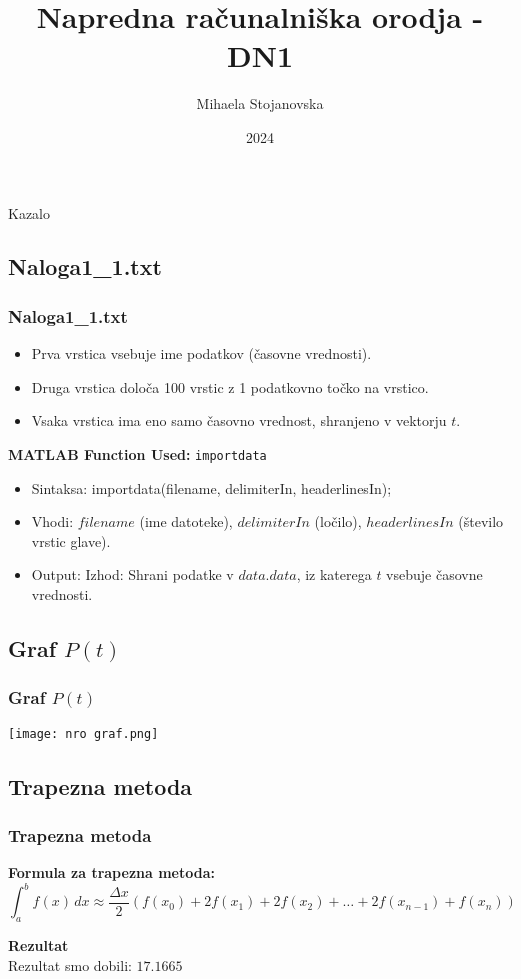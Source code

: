 \documentclass{beamer}
\title{Napredna računalniška orodja - DN1}
\author{Mihaela Stojanovska}
\date{2024}
\begin{document}
\begin{frame}
    \titlepage
\end{frame}

\begin{frame}{Kazalo}
    \tableofcontents
\end{frame}


\begin{frame}
\section{Naloga1\_1.txt}
\frametitle{Naloga1\_1.txt}
    \begin{itemize}
        \item Prva vrstica vsebuje ime podatkov (časovne vrednosti).
        \item Druga vrstica določa 100 vrstic z 1 podatkovno točko na vrstico.
        \item Vsaka vrstica ima eno samo časovno vrednost, shranjeno v vektorju $t$.
    \end{itemize}
    \vspace{0.5cm}
    \textbf{MATLAB Function Used:} \texttt{importdata} \\
    \begin{itemize}
        \item Sintaksa: importdata(filename, delimiterIn, headerlinesIn);
        \item Vhodi: $filename$ (ime datoteke), $delimiterIn$ (ločilo), $headerlinesIn$ (število vrstic glave).
        \item Output: Izhod: Shrani podatke v $data.data$, iz katerega $t$ vsebuje časovne vrednosti.
    \end{itemize}
\end{frame}


\begin{frame}
\section{Graf $P(t)$}
\frametitle{Graf $P(t)$}
    \texttt{[image: nro graf.png]}
    \centering
\end{frame}


\begin{frame}
\section{Trapezna metoda}
\frametitle{Trapezna metoda}
    \textbf{Formula za trapezna metoda:}
    \[
    \int_{a}^{b} f(x) \, dx \approx \frac{\Delta x}{2} \left( f(x_0) + 2f(x_1) + 2f(x_2) + \dots + 2f(x_{n-1}) + f(x_n) \right)
    \]
    
    \vspace{0.5cm}
    \textbf{Rezultat} \\
    Rezultat smo dobili: $17.1665$
\end{frame}
\end{document}
